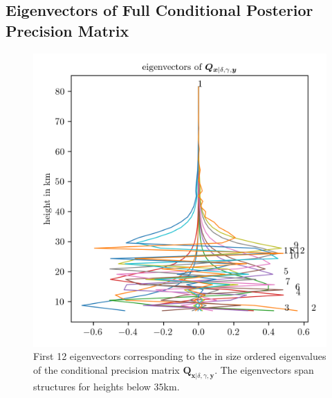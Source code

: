 \subsection{Eigenvectors of Full Conditional Posterior Precision Matrix}
 \begin{figure}[ht!]
 	\centering
 	\includegraphics{CovEigVec1.png}
 	\caption[First 12 eigenvectors of conditional precision matrix.]{First 12 eigenvectors corresponding to the in size ordered eigenvalues of the conditional precision matrix $\bm{Q}_{ \bm{x}|\delta, \gamma, \bm{y}}$.
 	The eigenvectors span structures for heights below $35$km.}
 	\label{fig:CovEigVec1}
 \end{figure}

